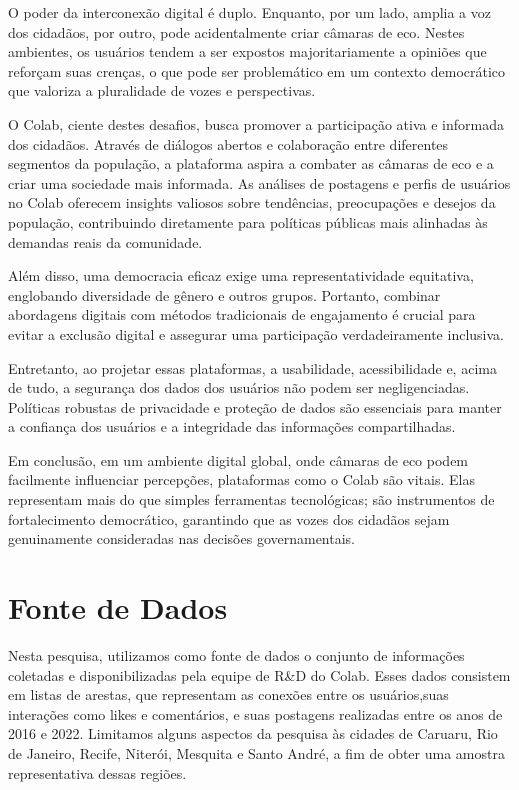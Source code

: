 O poder da interconexão digital é duplo. Enquanto, por um lado, amplia a voz dos cidadãos, por outro, pode acidentalmente criar câmaras de eco. Nestes ambientes, os usuários tendem a ser expostos majoritariamente a opiniões que reforçam suas crenças, o que pode ser problemático em um contexto democrático que valoriza a pluralidade de vozes e perspectivas.

O Colab, ciente destes desafios, busca promover a participação ativa e informada dos cidadãos. Através de diálogos abertos e colaboração entre diferentes segmentos da população, a plataforma aspira a combater as câmaras de eco e a criar uma sociedade mais informada. As análises de postagens e perfis de usuários no Colab oferecem insights valiosos sobre tendências, preocupações e desejos da população, contribuindo diretamente para políticas públicas mais alinhadas às demandas reais da comunidade.

Além disso, uma democracia eficaz exige uma representatividade equitativa, englobando diversidade de gênero e outros grupos. Portanto, combinar abordagens digitais com métodos tradicionais de engajamento é crucial para evitar a exclusão digital e assegurar uma participação verdadeiramente inclusiva.

Entretanto, ao projetar essas plataformas, a usabilidade, acessibilidade e, acima de tudo, a segurança dos dados dos usuários não podem ser negligenciadas. Políticas robustas de privacidade e proteção de dados são essenciais para manter a confiança dos usuários e a integridade das informações compartilhadas.

Em conclusão, em um ambiente digital global, onde câmaras de eco podem facilmente influenciar percepções, plataformas como o Colab são vitais. Elas representam mais do que simples ferramentas tecnológicas; são instrumentos de fortalecimento democrático, garantindo que as vozes dos cidadãos sejam genuinamente consideradas nas decisões governamentais.

\section{Fonte de Dados}
Nesta pesquisa, utilizamos como fonte de dados o conjunto de informações coletadas e disponibilizadas pela equipe de R\&D do Colab. Esses dados consistem em listas de arestas, que representam as conexões entre os usuários,suas interações como likes e comentários, e suas postagens realizadas entre os anos de 2016 e 2022. Limitamos alguns aspectos da pesquisa às cidades de Caruaru, Rio de Janeiro, Recife, Niterói, Mesquita e Santo André, a fim de obter uma amostra representativa dessas regiões.

